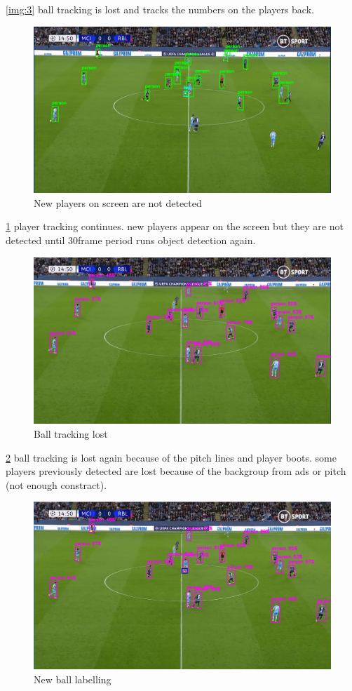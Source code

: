 \documentclass[
11pt,
twoside
]{report}
\begin{document}
\ref{img:3} ball tracking is lost and tracks the numbers on the players back.
\begin{figure}[H]
    \includegraphics[keepaspectratio, width=\columnwidth]{Screenshot_2022-03-03_21-36-05.png}
    \caption{New players on screen are not detected}
    \label{img:4}
\end{figure}
\ref{img:4} player tracking continues. new players appear on the screen but they are not
detected until 30frame period runs object detection again.
\begin{figure}[H]
    \includegraphics[keepaspectratio, width=\columnwidth]{Screenshot_2022-03-03_21-38-04.png}
    \caption{Ball tracking lost}
    \label{img:5}
\end{figure}
\ref{img:5} ball
tracking is lost again because of the pitch lines and player boots. some players previously detected are lost because of the backgroup from ads or pitch (not enough constract).
\begin{figure}[H]
    \includegraphics[keepaspectratio, width=\columnwidth]{Screenshot_2022-03-03_21-36-47.png}
    \caption{New ball labelling}
    \label{img:6}
\end{figure}
\end{document}
